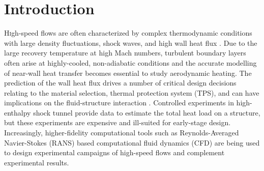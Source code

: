 \documentclass[journal ]{new-aiaa}
\begin{document}
\section{Introduction}

\lettrine{H}igh-speed flows are often characterized by complex thermodynamic conditions with large density fluctuations, shock waves, and high wall heat flux \cite{Wagner2018}. Due to the large recovery temperature at high Mach numbers, turbulent boundary layers often arise at highly-cooled, non-adiabatic conditions and the accurate modelling of near-wall heat transfer becomes essential to study aerodynamic heating. The prediction of the wall heat flux drives a number of critical design decisions relating to the material selection,  thermal protection system (TPS), and can have implications on the fluid-structure interaction \cite{DAUB2022116714}. Controlled experiments in high-enthalpy shock tunnel provide data to estimate the total heat load on a structure, but these experiments are expensive and ill-suited for early-stage design. Increasingly, higher-fidelity computational tools such as Reynolds-Averaged Navier-Stokes (RANS) based computational fluid dynamics (CFD) are being used to design experimental campaigns of high-speed flows and complement experimental results.
\end{document}
